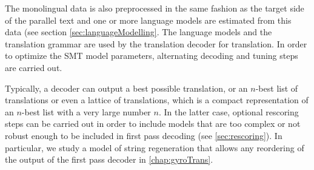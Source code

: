 The monolingual data is also preprocessed in the same fashion as the
target side of the parallel text and one or more language models are
estimated from this data (see section \autoref{sec:languageModelling}.
The language models and the translation grammar are used by
the translation decoder for translation. In order to optimize
the SMT model parameters, alternating decoding and tuning steps
are carried out.

Typically, a decoder can output a best possible
translation, or an $n$-best list of translations or even a lattice
of translations, which is a compact representation of an $n$-best list
with a very large number $n$. In the latter case, optional rescoring steps
can be carried out in order to include models that are too complex
or not robust enough to be included in first pass
decoding (see \autoref{sec:rescoring}). In particular, we study
a model of string regeneration that allows any reordering of the
output of the first pass decoder in \autoref{chap:gyroTrans}.
%
